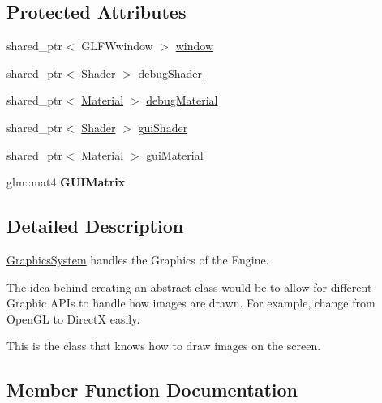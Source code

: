 \subsection*{Protected Attributes}
\begin{DoxyCompactItemize}
\item 
shared\+\_\+ptr$<$ G\+L\+F\+Wwindow $>$ \hyperlink{class_graphics_system_af64c8566c04ec068df5c50755b46e034}{window}
\item 
shared\+\_\+ptr$<$ \hyperlink{class_shader}{Shader} $>$ \hyperlink{class_graphics_system_a4598a940b017484e0c05f8b8d29eada0}{debug\+Shader}
\item 
shared\+\_\+ptr$<$ \hyperlink{class_material}{Material} $>$ \hyperlink{class_graphics_system_a0cc4e68c988b0181b4a72fe38931d4a1}{debug\+Material}
\item 
shared\+\_\+ptr$<$ \hyperlink{class_shader}{Shader} $>$ \hyperlink{class_graphics_system_aba28cabec543d87fa086bf64c41a7d1e}{gui\+Shader}
\item 
shared\+\_\+ptr$<$ \hyperlink{class_material}{Material} $>$ \hyperlink{class_graphics_system_afec79bbb5e358ea7f02ad7110017f333}{gui\+Material}
\item 
\hypertarget{class_graphics_system_ab3c54be1466226ad1fa45d8a68337f59}{}glm\+::mat4 {\bfseries G\+U\+I\+Matrix}\label{class_graphics_system_ab3c54be1466226ad1fa45d8a68337f59}

\end{DoxyCompactItemize}


\subsection{Detailed Description}
\hyperlink{class_graphics_system}{Graphics\+System} handles the Graphics of the Engine.

The idea behind creating an abstract class would be to allow for different Graphic A\+P\+I\textquotesingle{}s to handle how images are drawn. For example, change from Open\+G\+L to Direct\+X easily.

This is the class that knows how to draw images on the screen. 

\subsection{Member Function Documentation}
\hypertarget{class_graphics_system_aa166087f35ee2af8a9c9a45bd4a6103d}{}
